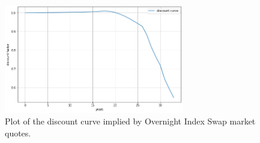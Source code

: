 \begin{figure}[htb]
	\centering
	\includegraphics[width=0.7\textwidth]{figures/example_discount_curve.png}
	\caption{Plot of the discount curve implied by Overnight Index Swap market quotes.}
	\label{fig:discount_curve}
\end{figure}
